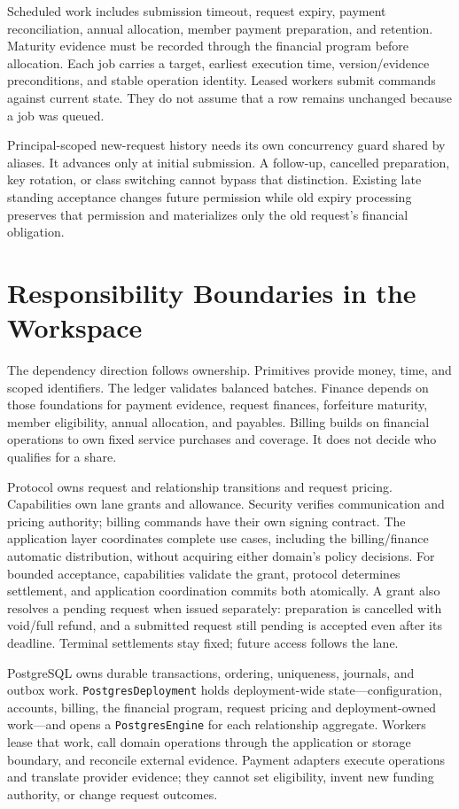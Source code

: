 \documentclass[11pt]{article}
\begin{document}
Scheduled work includes submission timeout, request expiry, payment
reconciliation, annual allocation, member payment preparation, and retention.
Maturity evidence must be recorded through the financial program before allocation.
Each job carries a target, earliest execution time, version/evidence preconditions,
and stable operation identity. Leased workers submit commands against current
state. They do not assume that a row remains unchanged because a job was queued.

Principal-scoped new-request history needs its own concurrency guard shared by
aliases. It advances only at initial submission. A follow-up, cancelled preparation,
key rotation, or class switching cannot bypass that distinction. Existing late
standing acceptance changes future
permission while old expiry processing preserves that permission and materializes
only the old request's financial obligation.

\section{Responsibility Boundaries in the Workspace}

The dependency direction follows ownership. Primitives provide money, time, and
scoped identifiers. The ledger validates balanced batches. Finance depends on
those foundations for payment evidence, request finances, forfeiture maturity,
member eligibility, annual allocation, and payables. Billing builds on financial
operations to own fixed service purchases and coverage. It does not decide who
qualifies for a share.

Protocol owns request and relationship transitions and request pricing.
Capabilities own lane grants and allowance. Security verifies communication
and pricing authority; billing commands have their own signing contract. The
application layer coordinates complete use cases, including the billing/finance
automatic distribution, without acquiring either domain's policy decisions.
For bounded acceptance, capabilities validate the grant, protocol determines
settlement, and application coordination commits both atomically. A grant also
resolves a pending request when issued separately: preparation is cancelled with
void/full refund, and a submitted request still pending is accepted even after its
deadline. Terminal settlements stay fixed; future access follows the lane.

PostgreSQL owns durable transactions, ordering, uniqueness, journals, and outbox
work. \texttt{PostgresDeployment} holds deployment-wide state---configuration,
accounts, billing, the financial program, request pricing and deployment-owned
work---and opens a \texttt{PostgresEngine} for each relationship aggregate. Workers lease that work, call domain operations through the application or
storage boundary, and reconcile external evidence. Payment adapters execute
operations and translate provider evidence; they cannot set eligibility, invent
new funding authority, or change request outcomes.
\end{document}

